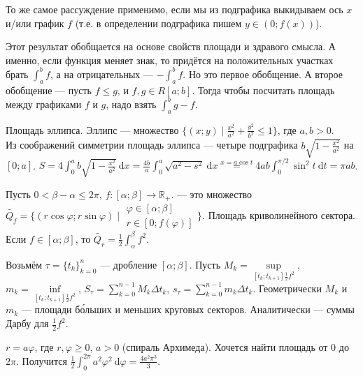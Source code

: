 \documentclass{article}
\begin{document}
\begin{itemize}
\begin{Proof}
        \end{Proof}
        \begin{Comment}
            То же самое рассуждение применимо, если мы из подграфика выкидываем ось $x$ и/или график $f$ (т.е. в определении подграфика пишем $y\in(0;f(x))$).
        \end{Comment}
        \begin{Comment}
            Этот результат обобщается на основе свойств площади и здравого смысла. А именно, если функция меняет знак, то придётся на положительных участках брать $\int_a^bf$, а на отрицательных --- $-\int_a^bf$. Но это первое обобщение. А второе обобщение --- пусть $f\leqslant g$, и $f,g\in R[a;b]$. Тогда чтобы посчитать площадь между графиками $f$ и $g$, надо взять $\int_a^bg-f$.
        \end{Comment}
        \begin{Example}
            Площадь эллипса. Эллипс --- множество $\{(x;y)\mid\frac{x^2}{a^2}+\frac{y^2}{b^2}\leqslant1\}$, где $a,b>0$.\\
            Из соображений симметрии площадь эллипса --- четыре подграфика $b\sqrt{1-\frac{x^2}{a^2}}$ на $[0;a]$. $S=4\int_0^ab\sqrt{1-\frac{x^2}{a^2}}~\mathrm dx=\frac{4b}a\int_0^a\sqrt{a^2-s^2}~\mathrm dx\overset{x=a\cos t}=4ab\int_0^{\pi/2}\sin^2t~\mathrm dt=\pi ab$.
        \end{Example}
        \dfn Пусть $0<\beta-\alpha\leqslant2\pi$, $f\colon[\alpha;\beta]\to\mathbb R_+$.  --- это множество $\widetilde{Q_f}=\{(r\cos\varphi;r\sin\varphi)\mid\substack{\varphi\in[\alpha;\beta]\\r\in[0;f(\varphi)]}\}$.
        \thm Площадь криволинейного сектора. Если $f\in[\alpha;\beta]$, то $\widetilde{Q_r}=\frac12\int_\alpha^\beta f^2$.
        \begin{Proof}
            Возьмём $\tau=\{t_k\}_{k=0}^n$ --- дробление $[\alpha;\beta]$. Пусть $M_k=\sup\limits_{[t_k;t_{k+1}]\frac12f^2}$, $m_k=\inf\limits_{[t_k;t_{k+1}]\frac12f^2}$, $S_\tau=\sum\limits_{k=0}^{n-1}M_k\Delta t_k$, $s_\tau=\sum\limits_{k=0}^{n-1}m_k\Delta t_k$. Геометрически $M_k$ и $m_k$ --- площади б\'{о}льших и меньших круговых секторов. Аналитически --- суммы Дарбу для $\frac12f^2$.
        \end{Proof}
        \begin{Example}
            $r=a\varphi$, где $r,\varphi\geqslant0$, $a>0$ (спираль Архимеда). Хочется найти площадь от 0 до $2\pi$. Получится $\frac12\int_0^{2\pi}a^2\varphi^2~\mathrm d\varphi=\frac{4a^2\pi^3}3$.

\end{Example}
\end{itemize}
\end{document}
